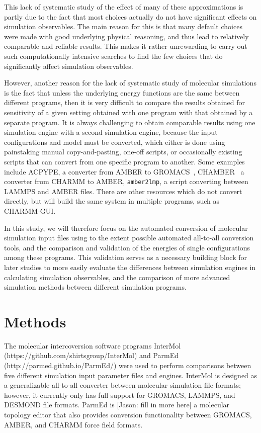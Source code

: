 This lack of systematic study of the effect of many of these
approximations is partly due to the fact that most choices actually do
not have significant effects on simulation observables. The main
reason for this is that many default choices were made with good
underlying physical reasoning, and thus lead to relatively comparable
and reliable results. This makes it rather unrewarding to carry out
such computationally intensive searches to find the few choices that
do significantly affect simulation observables.  

However, another reason for the lack of systematic study of molecular
simulations is the fact that unless the underlying energy functions
are the same between different programs, then it is very difficult to
compare the results obtained for sensitivity of a given setting
obtained with one program with that obtained by a separate program.
It is always challenging to obtain comparable results using one
simulation engine with a second simulation engine, because the input
configurations and model must be converted, which either is done using
painstaking manual copy-and-pasting, one-off scripts, or occasionally
existing scripts that can convert from one specific program to
another.  Some examples include ACPYPE, a converter from AMBER to
GROMACS~\citep{sousa_da_silva_acpype_2012},
CHAMBER~\citep{crowley_chamber:_2009} a converter from CHARMM to
AMBER, {\tt amber2lmp}, a script converting between LAMMPS and AMBER
files. There are other resources which do not convert directly, but
will build the same system in multiple programs, such as
CHARMM-GUI.~\citep{lee_charmm-gui_2016}

In this study, we will therefore focus on the automated conversion of
molecular simulation input files using to the extent possible
automated all-to-all conversion tools, and the comparison and
validation of the energies of single configurations among these
programs.  This validation serves as a necessary building block for
later studies to more easily evaluate the differences between
simulation engines in calculating simulation observables, and the
comparison of more advanced simulation methods between different
simulation programs.

\section*{Methods}
\begin{sloppypar}
The molecular intercoversion software programs InterMol
(https://github.com/shirtsgroup/InterMol) and ParmEd
(http://parmed.github.io/ParmEd/) were used to perform comparisons
between five different simulation input parameter files and engines.
InterMol is designed as a generalizable all-to-all converter between
molecular simulation file formats; however, it currently only has full
support for GROMACS, LAMMPS, and DESMOND file formats.  ParmEd is
[Jason: fill in more here] a molecular topology editor that also
provides conversion functionality between GROMACS, AMBER, and CHARMM
force field formats.
\end{sloppypar}

